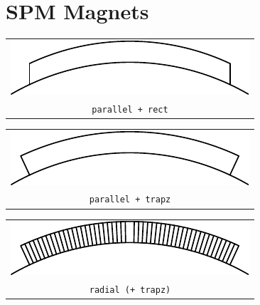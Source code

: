 \documentclass[a4paper,11pt,oneside,fleqn]{report}
\begin{document}
\newpage
\section{SPM Magnets}

\begin{tabular}{c}
\includegraphics[scale=1]{../examples/magnets/parallel_rect}
\\
\texttt{parallel + rect}
\end{tabular}
\vspace{5mm}

\noindent
\begin{tabular}{c}
\includegraphics[scale=1]{../examples/magnets/parallel_trapz}
\\
\texttt{parallel + trapz}
\end{tabular}
\vspace{5mm}

\noindent
\begin{tabular}{c}
\includegraphics[scale=1]{../examples/magnets/radial_trapz}
\\
\texttt{radial (+ trapz)}
\end{tabular}




\newpage
\end{document}
